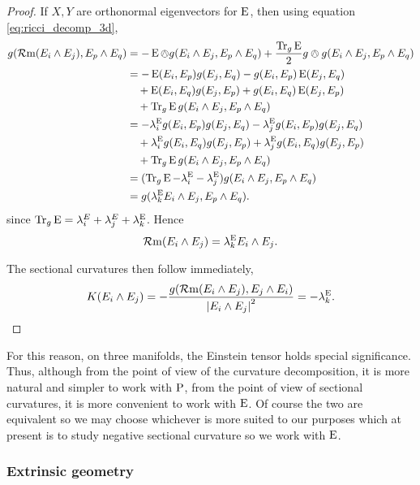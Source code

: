 \documentclass[a4paper, 12pt]{amsart}
\begin{document}
\begin{proof}
If \(X, Y\) are orthonormal eigenvectors for \(\operatorname{E}\), then using equation \eqref{eq:ricci_decomp_3d},
\[
\begin{split}
g(\operatorname{\mathcal{R}m}(E_i \wedge E_j), E_p \wedge E_q) &= -\operatorname{E} \owedge g (E_i \wedge E_j, E_p \wedge E_q) + \frac{\operatorname{Tr}_g \operatorname{E}}{2} g \owedge g (E_i \wedge E_j, E_p \wedge E_q) \\
&= - \operatorname{E}(E_i, E_p) g(E_j, E_q) - g(E_i, E_p) \operatorname{E}(E_j, E_q) \\
&\quad + \operatorname{E}(E_i, E_q) g(E_j, E_p) + g(E_i, E_q) \operatorname{E}(E_j, E_p) \\
&\quad + \operatorname{Tr}_g \operatorname{E} g(E_i \wedge E_j, E_p \wedge E_q) \\
&= - \lambda^{\operatorname{E}}_i g(E_i, E_p) g(E_j, E_q) - \lambda^{\operatorname{E}}_j g(E_i, E_p) g(E_j, E_q) \\
&\quad + \lambda^{\operatorname{E}}_i g(E_i, E_q) g(E_j, E_p) + \lambda^{\operatorname{E}}_j g(E_i, E_q) g(E_j, E_p) \\
&\quad + \operatorname{Tr}_g \operatorname{E} g(E_i \wedge E_j, E_p \wedge E_q) \\
&= (\operatorname{Tr}_g \operatorname{E} - \lambda^{\operatorname{E}}_i - \lambda^{\operatorname{E}}_j) g(E_i \wedge E_j, E_p \wedge E_q) \\
&= g(\lambda^{\operatorname{E}}_k E_i \wedge E_j, E_p \wedge E_q).
\end{split}
\]
since \(\operatorname{Tr}_g \operatorname{E} = \lambda^E_i + \lambda^E_j + \lambda^{\operatorname{E}}_k\). Hence
\[
\operatorname{\mathcal{R}m}(E_i \wedge E_j) = \lambda^{\operatorname{E}}_k E_i \wedge E_j.
\]

The sectional curvatures then follow immediately,
\[
K (E_i \wedge E_j) = -\frac{g(\operatorname{\mathcal{R}m}(E_i \wedge E_j), E_j \wedge E_i)}{\left\lvert{E_i \wedge E_j}\right\rvert^2} = -\lambda^{\operatorname{E}}_k.
\]
\end{proof}

\begin{rem}
For this reason, on three manifolds, the Einstein tensor holds special significance. Thus, although from the point of view of the curvature decomposition, it is more natural and simpler to work with \(\operatorname{P}\), from the point of view of sectional curvatures, it is more convenient to work with \(\operatorname{E}\). Of course the two are equivalent so we may choose whichever is more suited to our purposes which at present is to study negative sectional curvature so we work with \(\operatorname{E}\).
\end{rem}


\subsubsection{Extrinsic geometry}
\end{document}
